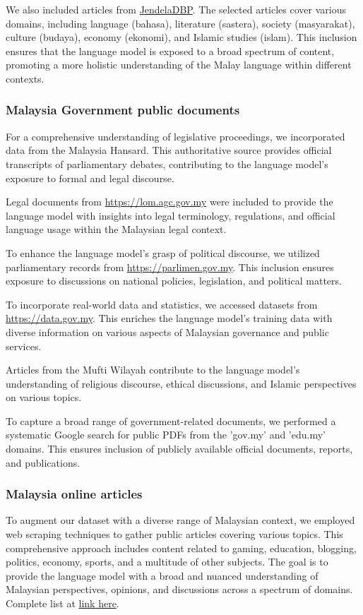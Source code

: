 \documentclass{article}
\begin{document}
We also included articles from \href{https://jendeladbp.my/}{JendelaDBP}. The selected articles cover various domains, including language (bahasa), literature (sastera), society (masyarakat), culture (budaya), economy (ekonomi), and Islamic studies (islam). This inclusion ensures that the language model is exposed to a broad spectrum of content, promoting a more holistic understanding of the Malay language within different contexts.

\subsubsection{Malaysia Government public documents}

For a comprehensive understanding of legislative proceedings, we incorporated data from the Malaysia Hansard. This authoritative source provides official transcripts of parliamentary debates, contributing to the language model's exposure to formal and legal discourse.

Legal documents from \url{https://lom.agc.gov.my} were included to provide the language model with insights into legal terminology, regulations, and official language usage within the Malaysian legal context.

To enhance the language model's grasp of political discourse, we utilized parliamentary records from \url{https://parlimen.gov.my}. This inclusion ensures exposure to discussions on national policies, legislation, and political matters.

To incorporate real-world data and statistics, we accessed datasets from \url{https://data.gov.my}. This enriches the language model's training data with diverse information on various aspects of Malaysian governance and public services.

Articles from the Mufti Wilayah contribute to the language model's understanding of religious discourse, ethical discussions, and Islamic perspectives on various topics.

To capture a broad range of government-related documents, we performed a systematic Google search for public PDFs from the 'gov.my' and 'edu.my' domains. This ensures inclusion of publicly available official documents, reports, and publications.

\subsubsection{Malaysia online articles}

To augment our dataset with a diverse range of Malaysian context, we employed web scraping techniques to gather public articles covering various topics. This comprehensive approach includes content related to gaming, education, blogging, politics, economy, sports, and a multitude of other subjects. The goal is to provide the language model with a broad and nuanced understanding of Malaysian perspectives, opinions, and discussions across a spectrum of domains. Complete list at \href{https://github.com/malaysia-ai/dedup-text-dataset/blob/main/mistral/combine-mistral.ipynb}{link here}.
\end{document}
